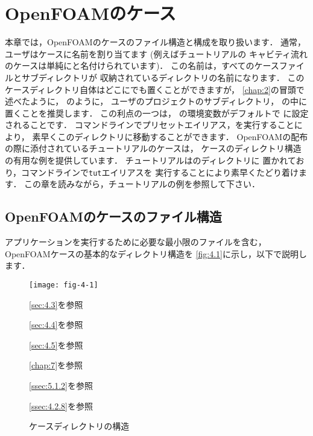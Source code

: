 \chapter{OpenFOAMのケース}
\label{chap:4}
%
%
本章では，OpenFOAMのケースのファイル構造と構成を取り扱います．
通常，ユーザはケースに名前を割り当てます (例えばチュートリアルの
キャビティ流れのケースは単純にと名付けられています)．
この名前は，すべてのケースファイルとサブディレクトリが
収納されているディレクトリの名前になります．
このケースディレクトリ自体はどこにでも置くことができますが，
\autoref{chap:2}の冒頭で述べたように，
のように，
ユーザのプロジェクトのサブディレクトリ，
%
%
の中に置くことを推奨します．
この利点の一つは，
%
%
の環境変数がデフォルトで
に設定されることです．
コマンドラインでプリセットエイリアス，を実行することにより，
素早くこのディレクトリに移動することができます．
OpenFOAMの配布の際に添付されているチュートリアルのケースは，
ケースのディレクトリ構造の有用な例を提供しています．
チュートリアルはのディレクトリに
置かれており，コマンドラインで\texttt{tut}エイリアスを
実行することにより素早くたどり着けます．
この章を読みながら，チュートリアルの例を参照して下さい．



\section{OpenFOAMのケースのファイル構造}
\label{sec:4.1}
アプリケーションを実行するために必要な最小限のファイルを含む，
OpenFOAMケースの基本的なディレクトリ構造を
\autoref{fig:4.1}に示し，以下で説明します．


\begin{figure}[ht]
 \begin{minipage}{.5\textwidth}
  \texttt{[image: fig-4-1]}
  \hskip5pt
  \begin{minipage}[b]{7zw}
   \def\baselinestretch{1.2}\selectfont
   \autoref{sec:4.3}を参照\par
   \autoref{sec:4.4}を参照\par
   \autoref{sec:4.5}を参照\par
   \vskip28pt
   \autoref{chap:7}を参照\par
   \vskip4pt
   \autoref{ssec:5.1.2}を参照\par
   \vskip68pt
   \autoref{ssec:4.2.8}を参照\par
   \vskip-12pt\null
  \end{minipage}
 \end{minipage}
 \caption{ケースディレクトリの構造}
 \label{fig:4.1}
\end{figure}



